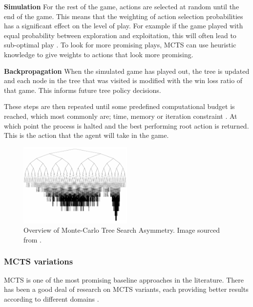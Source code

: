 \documentclass[journal]{IEEEtran}
\begin{document}
		\textbf{Simulation}
			For the rest of the game, actions are selected at random until the end of the game. This means that the weighting of action selection probabilities has a significant effect on the level of play. For example if the game played with equal probability between exploration and exploitation, this will often lead to sub-optimal play \cite{chaslot2008monte}. To look for more promising plays, MCTS can use heuristic knowledge to give weights to actions that look more promising.

		\textbf{Backpropagation}
			When the simulated game has played out, the tree is updated and each node in the tree that was visited is modified with the win loss ratio of that game. This informs future tree policy decisions.
			
			These steps are then repeated until some predefined computational budget is reached, which most commonly are; time, memory or iteration constraint \cite{browne2012survey}. At which point the process is halted and the best performing root action is returned. This is the action that the agent will take in the game.


		
		\begin{figure}[h]
		    \centering
		    \includegraphics[width=0.5\textwidth]{MCTSasymmetry}
		    \caption{Overview of Monte-Carlo Tree Search Asymmetry. Image sourced from \cite{coquelin2007bandit}. }
		    \label{fig:MCTS1}
		\end{figure}
		



		\subsubsection{MCTS variations}
			MCTS is one of the most promising baseline approaches in the  literature.
			There has been a good deal of research on MCTS variants, each providing better results according to different domains \cite{browne2012survey, park2015mcts, perez2014knowledge, ilhan2017monte, de2016monte, frydenberg2015investigating}.
\end{document}
